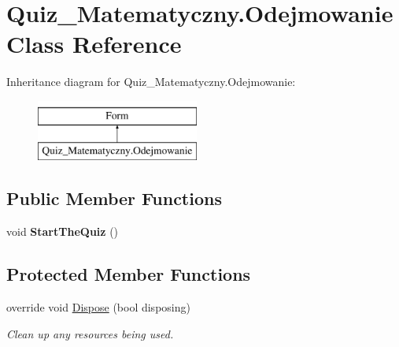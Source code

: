 \hypertarget{class_quiz___matematyczny_1_1_odejmowanie}{}\section{Quiz\+\_\+\+Matematyczny.\+Odejmowanie Class Reference}
\label{class_quiz___matematyczny_1_1_odejmowanie}
Inheritance diagram for Quiz\+\_\+\+Matematyczny.\+Odejmowanie\+:\begin{figure}[H]
\begin{center}
\leavevmode
\includegraphics[height=2.000000cm]{class_quiz___matematyczny_1_1_odejmowanie}
\end{center}
\end{figure}
\subsection*{Public Member Functions}
\begin{DoxyCompactItemize}
\item 
\mbox{\label{class_quiz___matematyczny_1_1_odejmowanie_a2a9188033cf3ceb1f2b4057ae8a66af7}} 
void {\bfseries Start\+The\+Quiz} ()
\end{DoxyCompactItemize}
\subsection*{Protected Member Functions}
\begin{DoxyCompactItemize}
\item 
override void \mbox{\hyperlink{class_quiz___matematyczny_1_1_odejmowanie_ab5092b577eee3d3e254b0910cd1ab9fa}{Dispose}} (bool disposing)
\begin{DoxyCompactList}\small\item\em Clean up any resources being used. \end{DoxyCompactList}\end{DoxyCompactItemize}
